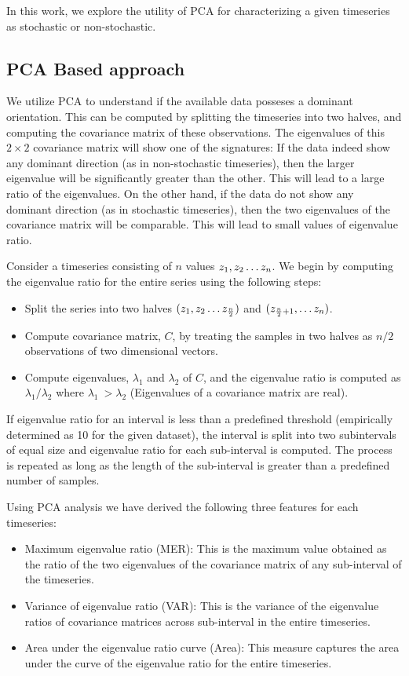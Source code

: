 \documentclass[10pt,conference]{IEEEtran}
\begin{document}
In this work, we explore the utility of PCA for characterizing a given timeseries as stochastic or non-stochastic.

\subsection{PCA Based approach}
We utilize PCA to understand if the available data posseses a dominant orientation. This can be computed by splitting the timeseries into two halves, and computing the covariance matrix of these observations. The eigenvalues of this $2 \times 2$ covariance matrix will show one of the signatures: If the data indeed show any dominant direction (as in non-stochastic timeseries), then the larger eigenvalue will be significantly greater than the other. This will lead to a large ratio of the eigenvalues. On the other hand, if the data do not show any dominant direction (as in stochastic timeseries), then the two eigenvalues of the covariance matrix will be comparable. This will lead to small values of eigenvalue ratio.

Consider a timeseries consisting of $n$ values  $z_1, z_2 \mathellipsis z_n$. We begin by computing the eigenvalue ratio for the entire series using the following steps:
\begin{itemize}
  \item  Split the series into two halves $(z_1, z_2 \mathellipsis z_{\frac{n}{2}})$ and $(z_{\frac{n}{2} + 1}, \mathellipsis z_n)$.
  \item Compute covariance matrix, $C$,  by treating the samples in two halves as $n/2$ observations of two dimensional vectors.
  \item Compute eigenvalues, $\lambda_1$ and $\lambda_2$ of $C$,  and the eigenvalue ratio is computed as  $\lambda_1/\lambda_2$ where $\lambda_1 \ > \lambda_2$ (Eigenvalues of a covariance matrix are real).
\end{itemize}
If eigenvalue ratio for an interval is less than a predefined threshold (empirically determined as 10 for the given dataset), the interval is split into two subintervals of equal size and eigenvalue ratio for each sub-interval is computed. The process is repeated as long as the length of the sub-interval is greater than a predefined number of samples.

Using PCA analysis we have derived the following three features for each timeseries:
\begin{itemize}
  \item Maximum eigenvalue ratio (MER): This is the maximum value obtained as the ratio of the two eigenvalues of the covariance matrix of any sub-interval of the timeseries.
  \item Variance of eigenvalue ratio (VAR): This is the variance of the eigenvalue ratios of covariance matrices across sub-interval in the entire timeseries.
  \item Area under the eigenvalue ratio curve (Area): This measure captures the area under the curve of the eigenvalue ratio for the entire timeseries.
\end{itemize}
\end{document}
